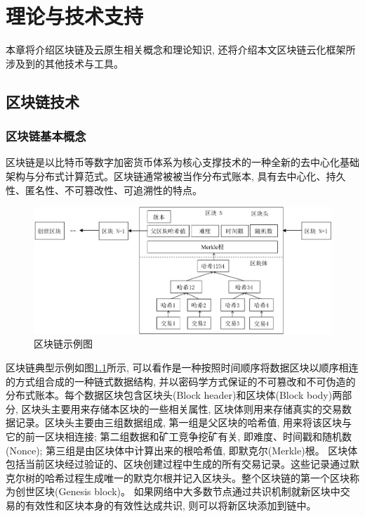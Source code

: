 \chapter{理论与技术支持}

本章将介绍区块链及云原生相关概念和理论知识, 还将介绍本文区块链云化框架所涉及到的其他技术与工具。

\section{区块链技术}\label{section: blockchain}

\subsection{区块链基本概念}
区块链是以比特币等数字加密货币体系为核心支撑技术的一种全新的去中心化基础架构与分布式计算范式\cite{1016383}。区块链通常被被当作分布式账本, 具有去中心化、持久性、匿名性、不可篡改性、可追溯性的特点。

\begin{figure}[h] %
    \centering %
    \includegraphics[width=1\textwidth]{FIGs/chapter2/blockchain_example.pdf} %
    \caption{区块链示例图} %
    \label{blockchain_example} %
\end{figure}%

区块链典型示例如图\ref{blockchain_example}所示, 可以看作是一种按照时间顺序将数据区块以顺序相连的方式组合成的一种链式数据结构, 并以密码学方式保证的不可篡改和不可伪造的分布式账本。每个数据区块包含区块头(Block header)和区块体(Block body)两部分, 区块头主要用来存储本区块的一些相关属性, 区块体则用来存储真实的交易数据记录。区块头主要由三组数据组成, 第一组是父区块的哈希值, 用来将该区块与它的前一区块相连接; 第二组数据和矿工竞争挖矿有关, 即难度、时间戳和随机数(Nonce); 第三组是由区块体中计算出来的根哈希值, 即默克尔(Merkle)根。
区块体包括当前区块经过验证的、区块创建过程中生成的所有交易记录。这些记录通过默克尔树的哈希过程生成唯一的默克尔根并记入区块头。整个区块链的第一个区块称为创世区块(Genesis block)。
如果网络中大多数节点通过共识机制就新区块中交易的有效性和区块本身的有效性达成共识, 则可以将新区块添加到链中。

